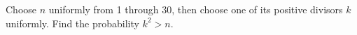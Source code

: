 Choose $ n $ uniformly from 1 through 30, then choose one of its positive divisors $ k $ uniformly. Find the probability $ k^2>n $.
